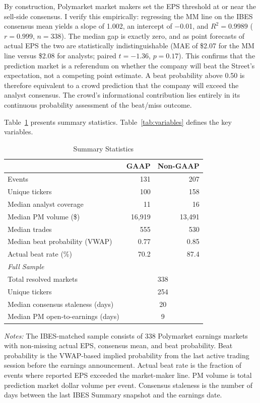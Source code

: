 \documentclass[11pt]{article}
\begin{document}
By construction, Polymarket market makers set the EPS threshold at or near the sell-side consensus. I verify this empirically: regressing the MM line on the IBES consensus mean yields a slope of 1.002, an intercept of $-$0.01, and $R^2 = 0.9989$ ($r = 0.999$, $n = 338$). The median gap is exactly zero, and as point forecasts of actual EPS the two are statistically indistinguishable (MAE of \$2.07 for the MM line versus \$2.08 for analysts; paired $t = -1.36$, $p = 0.17$). This confirms that the prediction market is a referendum on whether the company will beat the Street's expectation, not a competing point estimate. A beat probability above 0.50 is therefore equivalent to a crowd prediction that the company will exceed the analyst consensus. The crowd's informational contribution lies entirely in its continuous probability assessment of the beat/miss outcome.

Table~\ref{tab:summary} presents summary statistics. Table~\ref{tab:variables} defines the key variables.

\begin{table}[htbp]
\centering
\begin{threeparttable}
\caption{Summary Statistics}
\label{tab:summary}
\begin{tabular}{lrr}
\toprule
& GAAP & Non-GAAP \\
\midrule
Events & 131 & 207 \\
Unique tickers & 100 & 158 \\
Median analyst coverage & 11 & 16 \\
Median PM volume (\$) & 16{,}919 & 13{,}491 \\
Median trades & 555 & 530 \\
Median beat probability (VWAP) & 0.77 & 0.85 \\
Actual beat rate (\%) & 70.2 & 87.4 \\
\midrule
\multicolumn{3}{l}{\textit{Full Sample}} \\
Total resolved markets & \multicolumn{2}{c}{338} \\
Unique tickers & \multicolumn{2}{c}{254} \\
Median consensus staleness (days) & \multicolumn{2}{c}{20} \\
Median PM open-to-earnings (days) & \multicolumn{2}{c}{9} \\
\bottomrule
\end{tabular}
\begin{tablenotes}
\small
\item \textit{Notes:} The IBES-matched sample consists of 338 Polymarket earnings markets with non-missing actual EPS, consensus mean, and beat probability. Beat probability is the VWAP-based implied probability from the last active trading session before the earnings announcement. Actual beat rate is the fraction of events where reported EPS exceeded the market-maker line. PM volume is total prediction market dollar volume per event. Consensus staleness is the number of days between the last IBES Summary snapshot and the earnings date.
\end{tablenotes}
\end{threeparttable}
\end{table}
\end{document}

